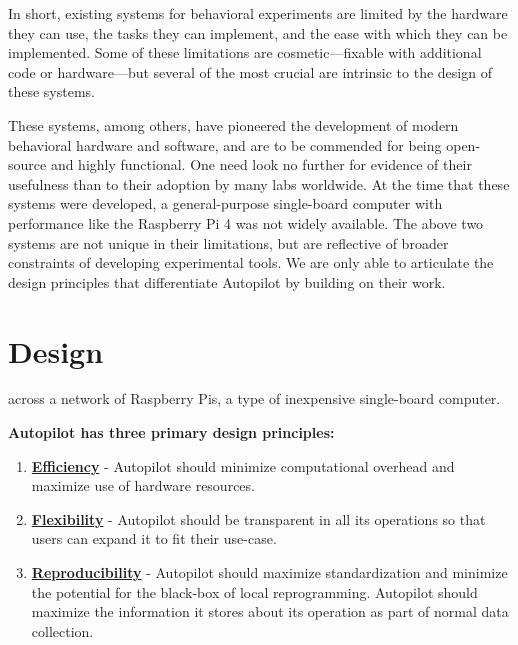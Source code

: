 \documentclass[nohyper, justified, notitlepage, marginals=raggedright,twoside=false,debug]{tufte-autopilot}
\begin{document}
In short, existing systems for behavioral experiments are limited by the hardware they can use, the tasks they can implement, and the ease with which they can be implemented. Some of these limitations are cosmetic---fixable with additional code or hardware---but several of the most crucial are intrinsic to the design of these systems.

These systems, among others, have pioneered the development of modern behavioral hardware and software, and are to be commended for being open-source and highly functional. One need look no further for evidence of their usefulness than to their adoption by many labs worldwide. At the time that these systems were developed, a general-purpose single-board computer with performance like the Raspberry Pi 4 was not widely available. The above two systems are not unique in their limitations, but are reflective of broader constraints of developing experimental tools. We are only able to articulate the design principles that differentiate Autopilot by building on their work. 


\chapter{Design}
\label{sec:design}

 across a network of Raspberry Pis, a type of inexpensive single-board computer. 

\vspace{12pt}

\textbf{Autopilot has three primary design principles:}

\begin{enumerate}
    \item \hyperref[sec:efficiency]{\textbf{Efficiency}} - Autopilot should minimize computational overhead and maximize use of hardware resources.
    \item \hyperref[sec:flexibility]{\textbf{Flexibility}} - Autopilot should be transparent in all its operations so that users can expand it to fit their use-case.
    \item \hyperref[sec:reproducibility]{\textbf{Reproducibility}} - Autopilot should maximize standardization and minimize the potential for the black-box of local reprogramming. Autopilot should maximize the information it stores about its operation as part of normal data collection.
\end{enumerate}
\end{document}
